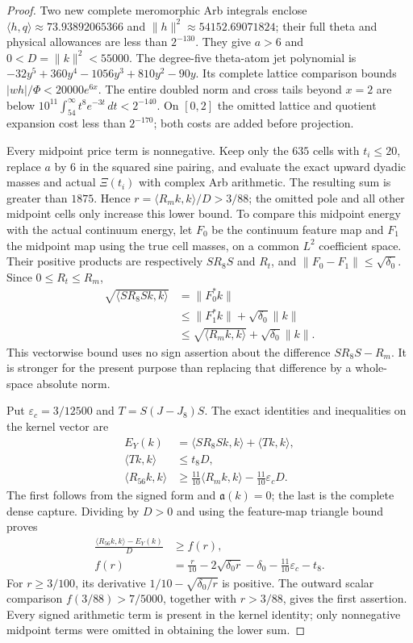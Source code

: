 \documentclass[12pt]{article}
\theoremstyle{remark}\newtheorem{remark}[theorem]{Remark}
\newcommand{\dd}{\,d}
\begin{document}
\begin{proof}
Two new complete meromorphic Arb integrals enclose
$\langle h,q\rangle\approx73.93892065366$ and
$\|h\|^2\approx54152.69071824$; their full theta and physical
allowances are less than $2^{-130}$. They give $a>6$ and
$0<D=\|k\|^2<55000$. The degree-five theta-atom jet polynomial is
$-32y^5+360y^4-1056y^3+810y^2-90y$. Its complete lattice comparison
bounds $|wh|/\Phi<20000e^{6x}$. The entire doubled norm and cross
tails beyond $x=2$ are below
$10^{11}\int_{54}^\infty t^8e^{-3t}\dd t<2^{-140}$.
On $[0,2]$ the omitted lattice and quotient expansion cost less than
$2^{-170}$; both costs are added before projection.

Every midpoint price term is nonnegative. Keep only the $635$ cells
with $t_i\le20$, replace $a$ by $6$ in the squared sine pairing,
and evaluate the exact upward dyadic masses and actual $\Xi(t_i)$
with complex Arb arithmetic. The resulting sum is greater than $1875$.
Hence $r=\langle R_mk,k\rangle/D>3/88$; the omitted pole and all
other midpoint cells only increase this lower bound.
To compare this midpoint energy with the actual continuum energy,
let $F_0$ be the continuum feature map and $F_1$ the midpoint map
using the true cell masses, on a common $L^2$ coefficient space.
Their positive products are respectively $SR_8S$ and $R_t$, and
$\|F_0-F_1\|\le\sqrt{\delta_0}$. Since $0\le R_t\le R_m$,
\begin{align*}
 \sqrt{\langle SR_8Sk,k\rangle}
 &=\|F_0^*k\|\\
 &\le\|F_1^*k\|+\sqrt{\delta_0}\|k\|\\
 &\le\sqrt{\langle R_mk,k\rangle}+\sqrt{\delta_0}\|k\|.
\end{align*}
This vectorwise bound uses no sign assertion about the difference
$SR_8S-R_m$. It is stronger for the present purpose than replacing
that difference by a whole-space absolute norm.

Put $\varepsilon_c=3/12500$ and $T=S(J-J_8)S$. The exact identities
and inequalities on the kernel vector are
\begin{align*}
 E_Y(k)&=\langle SR_8Sk,k\rangle+\langle Tk,k\rangle,\\
 \langle Tk,k\rangle&\le t_8D,\\
 \langle R_{56}k,k\rangle
 &\ge\frac{11}{10}\langle R_mk,k\rangle
                  -\frac{11}{10}\varepsilon_cD.
\end{align*}
The first follows from the signed form and $\mathfrak a(k)=0$;
the last is the complete dense capture. Dividing by $D>0$ and
using the feature-map triangle bound proves
\begin{align}\label{barrierfunction}
 \frac{\langle R_{56}k,k\rangle-E_Y(k)}D&\ge f(r),\\
 f(r)&=\frac r{10}-2\sqrt{\delta_0r}-\delta_0
                     -\frac{11}{10}\varepsilon_c-t_8.\nonumber
\end{align}
For $r\ge3/100$, its derivative
$1/10-\sqrt{\delta_0/r}$ is positive. The outward scalar comparison
$f(3/88)>7/5000$, together with $r>3/88$, gives the first assertion.
Every signed arithmetic term is present in the kernel identity; only
nonnegative midpoint terms were omitted in obtaining the lower sum.


\end{proof}
\end{document}
